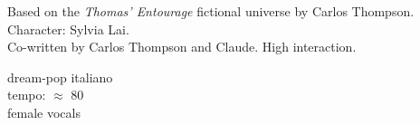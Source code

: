 

\begin{notes}
Based on the \emph{Thomas’ Entourage} fictional universe by Carlos Thompson.\\
Character: Sylvia Lai.\\
Co-written by Carlos Thompson and Claude. %
High interaction.
\end{notes}

\begin{style}
dream-pop italiano\\
tempo: \quarternote\(\approx\) 80\\
female vocals
\end{style}

